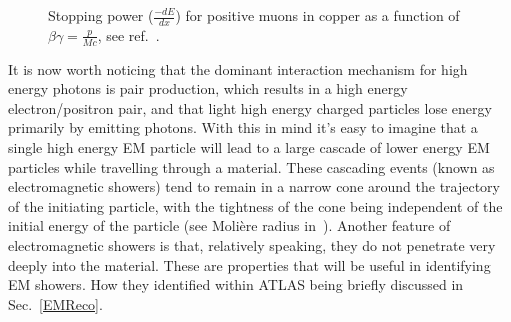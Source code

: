 \begin{figure}[!ht]
  \begin{center}
  \end{center}
  \caption[Stopping power for positive muons in copper.]
  {\small Stopping power ($\frac{-dE}{dx}$) for positive muons in copper as a function of $\beta\gamma=\frac{p}{Mc}$, see ref.~\cite{PDG}.} 
  \label{StoppingMuon}
\end{figure}

It is now worth noticing that the dominant interaction mechanism for high energy photons is pair production, which results in a high energy electron/positron pair, and that light high energy charged particles lose energy primarily by emitting photons.  
With this in mind it's easy to imagine that a single high energy EM particle will lead to a large cascade of lower energy EM particles while travelling through a material.  
These cascading events (known as electromagnetic showers) tend to remain in a narrow cone around the trajectory of the initiating particle, with the tightness of the cone being independent of the initial energy of the particle (see Moli{\`e}re radius in~\cite{grupen2008particle}).  
Another feature of electromagnetic showers is that, relatively speaking, they do not penetrate very deeply into the material.   
These are properties that will be useful in identifying EM showers.  
How they identified within ATLAS being briefly discussed in Sec.~\ref{EMReco}. 

